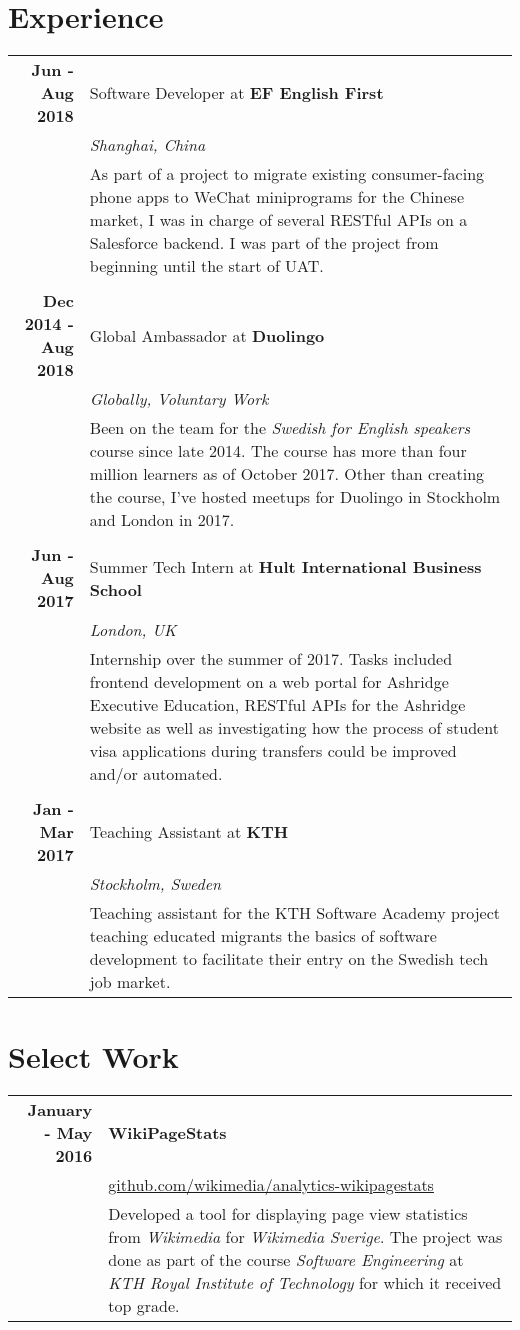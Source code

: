 \documentclass[a4paper,10pt]{article}
\begin{document}
\section{Experience}
\begin{tabular}{r|p{11cm}}
\textbf{Jun - Aug 2018} & Software Developer at \textbf{EF English First} \\
& \emph{Shanghai, China} \\
& \footnotesize{As part of a project to migrate existing consumer-facing phone apps to WeChat miniprograms for the Chinese market, I was in charge of several RESTful APIs on a Salesforce backend. I was part of the project from beginning until the start of UAT.} \\ \\

\textbf{Dec 2014 - Aug 2018} & Global Ambassador at \textbf{Duolingo}\\&\emph{Globally, Voluntary Work}\\&\footnotesize{Been on the team for the \emph{Swedish for English speakers} course since late 2014. The course has more than four million learners as of October 2017. Other than creating the course, I've hosted meetups for Duolingo in Stockholm and London in 2017.}\\ \\

\textbf{Jun - Aug 2017} & Summer Tech Intern at \textbf{Hult International Business School} \\
& \emph{London, UK} \\
& \footnotesize{Internship over the summer of 2017. Tasks included frontend development on a web portal for Ashridge Executive Education, RESTful APIs for the Ashridge website as well as investigating how the process of student visa applications during transfers could be improved and/or automated.} \\ \\

\textbf{Jan - Mar 2017} & Teaching Assistant at \textbf{KTH} \\
& \emph{Stockholm, Sweden} \\
& \footnotesize{Teaching assistant for the KTH Software Academy project teaching educated migrants the basics of software development to facilitate their entry on the Swedish tech job market.} \\
\end{tabular}

\section{Select Work}
\begin{tabular}{r|p{11cm}}
\textbf{January - May 2016} & \textbf{WikiPageStats} \\
& \href{https://github.com/wikimedia/analytics-wikipagestats}{github.com/wikimedia/analytics-wikipagestats} \\
& \footnotesize{Developed a tool for displaying page view statistics from \emph{Wikimedia} for \emph{Wikimedia Sverige}. The project was done as part of the course \emph{Software Engineering} at \emph{KTH Royal Institute of Technology} for which it received top grade.}
\end{tabular}
\end{document}
